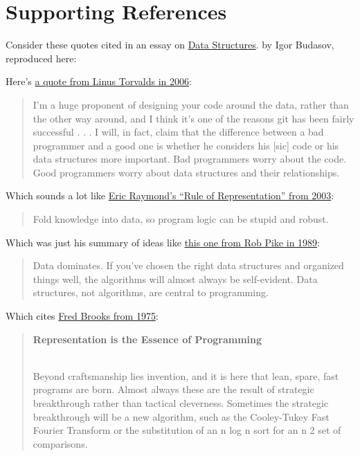 \documentclass[
  letterpaper,
  DIV=11,
  numbers=noendperiod]{scrreport}
\begin{document}
\hypertarget{supporting-references}{%
\section{Supporting References}\label{supporting-references}}

Consider these quotes cited in an essay on
\href{https://medium.com/webdevops/data-structures-548cbea9c520}{Data
Structures}. by Igor Budasov, reproduced here:

Here's \href{https://lwn.net/Articles/193245/}{a quote from Linus
Torvalds in 2006}:

\begin{quote}
I'm a huge proponent of designing your code around the data, rather than
the other way around, and I think it's one of the reasons git has been
fairly successful . . . I will, in fact, claim that the difference
between a bad programmer and a good one is whether he considers his
{[}sic{]} code or his data structures more important. Bad programmers
worry about the code. Good programmers worry about data structures and
their relationships.
\end{quote}

Which sounds a lot like
\href{http://www.catb.org/~esr/writings/taoup/html/ch01s06.html}{Eric
Raymond's ``Rule of Representation'' from 2003}:

\begin{quote}
Fold knowledge into data, so program logic can be stupid and robust.
\end{quote}

Which was just his summary of ideas like
\href{http://doc.cat-v.org/bell_labs/pikestyle}{this one from Rob Pike
in 1989}:

\begin{quote}
Data dominates. If you've chosen the right data structures and organized
things well, the algorithms will almost always be self-evident. Data
structures, not algorithms, are central to programming.
\end{quote}

Which cites
\href{https://archive.org/stream/mythicalmanmonth00fred/mythicalmanmonth00fred_djvu.txt}{Fred
Brooks from 1975}:

\begin{quote}
\textbf{Representation is the Essence of Programming}\\
\strut \\
Beyond craftsmanship lies invention, and it is here that lean, spare,
fast programs are born. Almost always these are the result of strategic
breakthrough rather than tactical cleverness. Sometimes the strategic
breakthrough will be a new algorithm, such as the Cooley-Tukey Fast
Fourier Transform or the substitution of an n log n sort for an n 2 set
of comparisons.
\end{quote}
\end{document}
